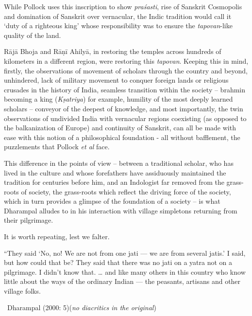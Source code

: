 While Pollock uses this inscription to show \textit{praśasti}, rise of Sanskrit Cosmopolis and domination of Sanskrit over vernacular, the Indic tradition would call it ‘duty of a righteous king’ whose responsibility was to ensure the \textit{tapovan}-like quality of the land.

Rājā Bhoja and Rāṇī Ahilyā, in restoring the temples across hundreds of kilometers in a different region, were restoring this \textit{tapovan}. Keeping this in mind, firstly, the observations of movement of scholars through the country and beyond, unhindered, lack of military movement to conquer foreign lands or religious crusades in the history of India, seamless transition within the society – brahmin becoming a king (\textit{Kṣatriya}) for example, humility of the most deeply learned scholars – conveyor of the deepest of knowledge, and most importantly, the twin observations of undivided India with vernacular regions coexisting (as opposed to the balkanization of Europe) and continuity of Sanskrit, can all be made with ease with this notion of a philosophical foundation - all without bafflement, the puzzlements that Pollock \textit{et al} face.

This difference in the points of view – between a traditional scholar, who has lived in the culture and whose forefathers have assiduously maintained the tradition for centuries before him, and an Indologist far removed from the grass-roots of society, the grass-roots which reflect the driving force of the society, which in turn provides a glimpse of the foundation of a society – is what Dharampal alludes to in his interaction with village simpletons returning from their pilgrimage.

It is worth repeating, lest we falter.

\begin{myquote}
“They said ‘No, no! We are not from one jati — we are from several jatis.’ I said, but how could that be? They said that there was no jati on a yatra not on a pilgrimage. I didn’t know that. … and like many others in this country who know little about the ways of the ordinary Indian — the peasants, artisans and other village folks. 

~\hfill Dharampal (2000: 5)(\textit{no diacritics in the original})
\end{myquote}

